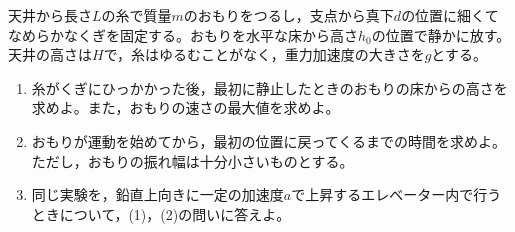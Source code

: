 \hakosyokika
\item
    \begin{mawarikomi}{150pt}{}
        天井から長さ$L$の糸で質量$m$のおもりをつるし，支点から真下$d$の位置に細くてなめらかなくぎを固定する。おもりを水平な床から高さ$h_0$の位置で静かに放す。天井の高さは$H$で，糸はゆるむことがなく，重力加速度の大きさを$g$とする。
        \begin{enumerate}
            \item 糸がくぎにひっかかった後，最初に静止したときのおもりの床からの高さを求めよ。また，おもりの速さの最大値を求めよ。
            \item おもりが運動を始めてから，最初の位置に戻ってくるまでの時間を求めよ。ただし，おもりの振れ幅は十分小さいものとする。
            \item 同じ実験を，鉛直上向きに一定の加速度$a$で上昇するエレベーター内で行うときについて，(1)，(2)の問いに答えよ。
        \end{enumerate}
    \end{mawarikomi}